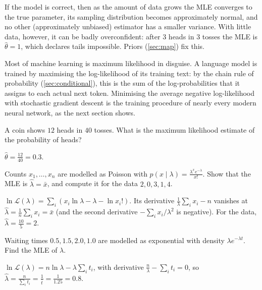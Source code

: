 \begin{remark}
If the model is correct, then as the amount of data grows the MLE converges to
the true parameter, its sampling distribution becomes approximately normal, and
no other (approximately unbiased) estimator has a smaller variance. With little
data, however, it can be badly overconfident: after $3$ heads in $3$ tosses the
MLE is $\hat\theta = 1$, which declares tails impossible. Priors
(\cref{sec:map}) fix this.
\end{remark}

\begin{mlnote}
Most of machine learning is maximum likelihood in disguise. A language model is
trained by maximising the log-likelihood of its training text: by the chain rule
of probability (\cref{sec:conditional}), this is the sum of the log-probabilities
that it assigns to each actual next token. Minimising the average negative
log-likelihood with stochastic gradient descent is the training procedure of
nearly every modern neural network, as the next section shows.
\end{mlnote}

\sectionexercises

\begin{exercise}
A coin shows $12$ heads in $40$ tosses. What is the maximum likelihood estimate
of the probability of heads?
\end{exercise}
\begin{solution}
$\hat\theta = \tfrac{12}{40} = 0.3$.
\end{solution}

\begin{exercise}
Counts $x_1, \dots, x_n$ are modelled as Poisson with
$p(x \mid \lambda) = \frac{\lambda^xe^{-\lambda}}{x!}$. Show that the MLE is
$\hat\lambda = \bar x$, and compute it for the data $2, 0, 3, 1, 4$.
\end{exercise}
\begin{solution}
$\ln\mathcal{L}(\lambda) = \sum_i(x_i\ln\lambda - \lambda - \ln x_i!)$. Its
derivative $\tfrac{1}{\lambda}\sum_ix_i - n$ vanishes at $\hat\lambda =
\tfrac1n\sum_ix_i = \bar x$ (and the second derivative $-\sum_ix_i/\lambda^2$ is
negative). For the data, $\hat\lambda = \tfrac{10}{5} = 2$.
\end{solution}

\begin{exercise}
Waiting times $0.5, 1.5, 2.0, 1.0$ are modelled as exponential with density
$\lambda e^{-\lambda t}$. Find the MLE of $\lambda$.
\end{exercise}
\begin{solution}
$\ln\mathcal{L}(\lambda) = n\ln\lambda - \lambda\sum_it_i$, with derivative
$\tfrac n\lambda - \sum_it_i = 0$, so $\hat\lambda = \tfrac{n}{\sum_it_i} =
\tfrac{1}{\bar t} = \tfrac{1}{1.25} = 0.8$.
\end{solution}

